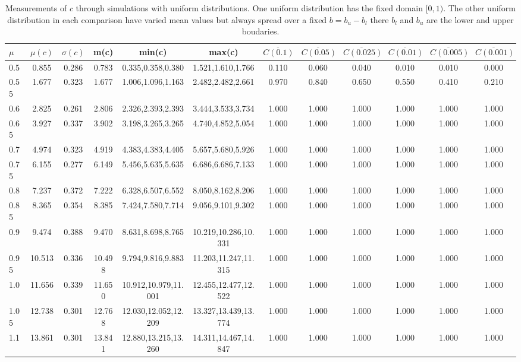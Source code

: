 \begin{table*}[h!]
\begin{center}
\begin{tabular}{| l | c | c | c | c | c | c | c | c | c | c | c |}\hline
$\mu$ & $\mu(c)$ & $\sigma(c)$ & m(c) & min(c) & max(c) & $\overline{C(0.1)}$ & $\overline{C(0.05)}$ & $\overline{C(0.025)}$ & $\overline{C(0.01)}$ & $\overline{C(0.005)}$ & $\overline{C(0.001)}$ \\\hline
0.5 & 0.855 & 0.286 & 0.783 & 0.335,0.358,0.380 & 1.521,1.610,1.766  & 0.110  & 0.060  & 0.040  & 0.010  & 0.010  & 0.000 \\\hline
0.55 & 1.677 & 0.323 & 1.677 & 1.006,1.096,1.163 & 2.482,2.482,2.661  & 0.970  & 0.840  & 0.650  & 0.550  & 0.410  & 0.210 \\\hline
0.6 & 2.825 & 0.261 & 2.806 & 2.326,2.393,2.393 & 3.444,3.533,3.734  & 1.000  & 1.000  & 1.000  & 1.000  & 1.000  & 1.000 \\\hline
0.65 & 3.927 & 0.337 & 3.902 & 3.198,3.265,3.265 & 4.740,4.852,5.054  & 1.000  & 1.000  & 1.000  & 1.000  & 1.000  & 1.000 \\\hline
0.7 & 4.974 & 0.323 & 4.919 & 4.383,4.383,4.405 & 5.657,5.680,5.926  & 1.000  & 1.000  & 1.000  & 1.000  & 1.000  & 1.000 \\\hline
0.75 & 6.155 & 0.277 & 6.149 & 5.456,5.635,5.635 & 6.686,6.686,7.133  & 1.000  & 1.000  & 1.000  & 1.000  & 1.000  & 1.000 \\\hline
0.8 & 7.237 & 0.372 & 7.222 & 6.328,6.507,6.552 & 8.050,8.162,8.206  & 1.000  & 1.000  & 1.000  & 1.000  & 1.000  & 1.000 \\\hline
0.85 & 8.365 & 0.354 & 8.385 & 7.424,7.580,7.714 & 9.056,9.101,9.302  & 1.000  & 1.000  & 1.000  & 1.000  & 1.000  & 1.000 \\\hline
0.9 & 9.474 & 0.388 & 9.470 & 8.631,8.698,8.765 & 10.219,10.286,10.331  & 1.000  & 1.000  & 1.000  & 1.000  & 1.000  & 1.000 \\\hline
0.95 & 10.513 & 0.336 & 10.498 & 9.794,9.816,9.883 & 11.203,11.247,11.315  & 1.000  & 1.000  & 1.000  & 1.000  & 1.000  & 1.000 \\\hline
1.0 & 11.656 & 0.339 & 11.650 & 10.912,10.979,11.001 & 12.455,12.477,12.522  & 1.000  & 1.000  & 1.000  & 1.000  & 1.000  & 1.000 \\\hline
1.05 & 12.738 & 0.301 & 12.768 & 12.030,12.052,12.209 & 13.327,13.439,13.774  & 1.000  & 1.000  & 1.000  & 1.000  & 1.000  & 1.000 \\\hline
1.1 & 13.861 & 0.301 & 13.841 & 12.880,13.215,13.260 & 14.311,14.467,14.847  & 1.000  & 1.000  & 1.000  & 1.000  & 1.000  & 1.000 \\\hline
\end{tabular}
\caption{Measurements of $c$ through simulations
        with uniform distributions.
        One uniform distribution has the fixed domain $[0,1)$.
        The other uniform distribution in each comparison
        have varied mean values but always
        spread over a fixed $b=b_u-b_l$ there $b_l$ and $b_u$ are the lower and upper boudaries.}
\end{center}
\end{table*}